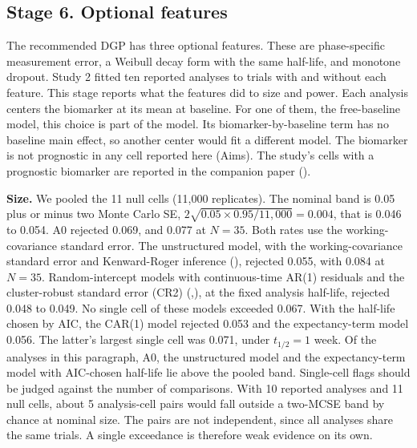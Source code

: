 \documentclass[
  11pt,
]{article}
\begin{document}
\subsection{Stage 6. Optional features}\label{stage-6.-optional-features}

The recommended DGP has three optional features. These are
phase-specific measurement error, a Weibull decay form with the same
half-life, and monotone dropout. Study 2 fitted ten reported analyses
to trials with and without each feature. This stage reports what the
features did to size and power. Each analysis centers the biomarker
at its mean at baseline. For one of them, the free-baseline model,
this choice is part of the model. Its biomarker-by-baseline term has
no baseline main effect, so another center would fit a different
model. The biomarker is not prognostic in
any cell reported here (Aims). The study's cells with a prognostic
biomarker are reported in the companion paper ().

\textbf{Size.} We pooled the 11 null cells
(11,000 replicates). The nominal band is 0.05 plus or minus two Monte
Carlo SE, \(2\sqrt{0.05 \times 0.95 / 11{,}000} = 0.004\), that is
0.046 to 0.054. A0
rejected 0.069, and
0.077 at \(N = 35\). Both rates use the
working-covariance standard error. The unstructured model, with the
working-covariance standard error and Kenward-Roger inference
(), rejected
0.055, with 0.084 at
\(N = 35\). Random-intercept models with continuous-time AR(1) residuals
and the cluster-robust standard error (CR2) (,), at the fixed analysis half-life, rejected
0.048 to 0.049. No single
cell of these models exceeded 0.067. With the
half-life chosen by AIC, the CAR(1) model rejected
0.053 and the expectancy-term model
0.056. The latter's largest single cell was
0.071, under
\(t_{1/2} = 1\) week. Of the analyses in this
paragraph, A0, the unstructured model and the expectancy-term model with AIC-chosen half-life
lie above the pooled band. Single-cell flags should be judged against
the number of comparisons. With 10 reported analyses and 11
null cells, about
5 analysis-cell pairs would
fall outside a two-MCSE band by chance at nominal size. The pairs are
not independent, since all analyses share the same trials. A single
exceedance is therefore weak evidence on its own.
\end{document}
